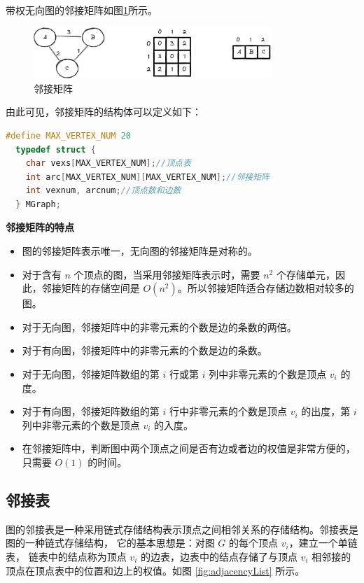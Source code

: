 \documentclass[lang=cn,newtx,10pt,scheme=chinese]{../elegantbook}
\begin{document}
带权无向图的邻接矩阵如图\ref{fig:adjacencyMatrix_WeightedUndirected}所示。
\begin{figure}[h!]
  \centering
  \includegraphics[width=0.8\textwidth]{./figure/pdf/cropped/adjacencyMatrix_weightUnDirected.pdf}
  \caption{邻接矩阵}
  \label{fig:adjacencyMatrix_WeightedUndirected}
\end{figure}

由此可见，邻接矩阵的结构体可以定义如下：

\begin{lstlisting}[language=C++, caption={邻接矩阵结构体}]
  #define MAX_VERTEX_NUM 20
  typedef struct {
    char vexs[MAX_VERTEX_NUM];//顶点表
    int arc[MAX_VERTEX_NUM][MAX_VERTEX_NUM];//邻接矩阵
    int vexnum, arcnum;//顶点数和边数
  } MGraph;
\end{lstlisting}

\textbf{邻接矩阵的特点}

\begin{itemize}
  \item 图的邻接矩阵表示唯一，无向图的邻接矩阵是对称的。
  \item 对于含有 $n$ 个顶点的图，当采用邻接矩阵表示时，需要 $n^2$ 个存储单元，因此，邻接矩阵的存储空间是 $O(n^2)$。所以邻接矩阵适合存储边数相对较多的图。
  \item 对于无向图，邻接矩阵中的非零元素的个数是边的条数的两倍。
  \item 对于有向图，邻接矩阵中的非零元素的个数是边的条数。
  \item 对于无向图，邻接矩阵数组的第 $i$ 行或第 $i$ 列中非零元素的个数是顶点 $v_i$ 的度。
  \item 对于有向图，邻接矩阵数组的第 $i$ 行中非零元素的个数是顶点 $v_i$ 的出度，第 $i$ 列中非零元素的个数是顶点 $v_i$ 的入度。
  \item 在邻接矩阵中，判断图中两个顶点之间是否有边或者边的权值是非常方便的，只需要 $O(1)$ 的时间。
  \end{itemize}


\subsection{邻接表}
图的邻接表是一种采用链式存储结构表示顶点之间相邻关系的存储结构。邻接表是图的一种链式存储结构，
它的基本思想是：对图 $G$ 的每个顶点 $v_i$，建立一个单链表，
链表中的结点称为顶点 $v_i$ 的边表，边表中的结点存储了与顶点 $v_i$ 相邻接的顶点在顶点表中的位置和边上的权值。如图 \ref{fig:adjacencyList} 所示。
\end{document}
